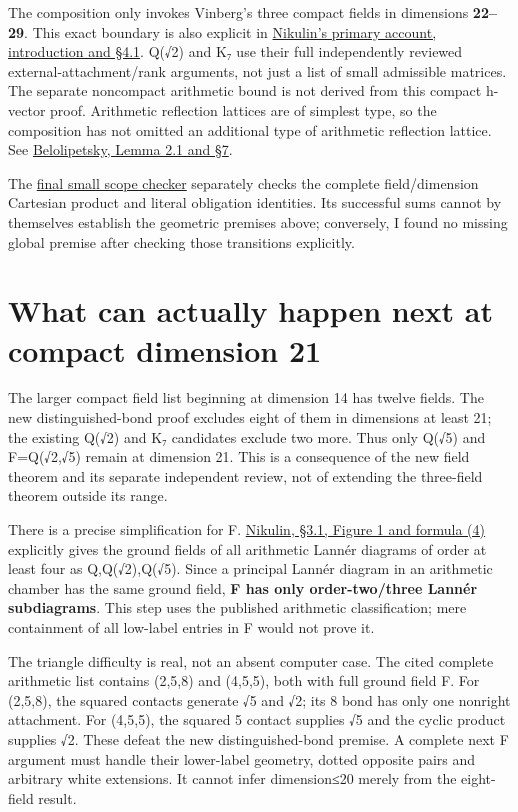 \documentclass[
  10pt,
]{report}
\begin{document}
The composition only invokes Vinberg's three compact fields in
dimensions \textbf{22--29}. This exact boundary is also explicit in
\href{https://arxiv.org/pdf/0708.3991}{Nikulin's primary account,
introduction and §4.1}. Q(√2) and K₇ use their full independently
reviewed external-attachment/rank arguments, not just a list of small
admissible matrices. The separate noncompact arithmetic bound is not
derived from this compact h-vector proof. Arithmetic reflection lattices
are of simplest type, so the composition has not omitted an additional
type of arithmetic reflection lattice. See
\href{https://arxiv.org/pdf/1506.03111}{Belolipetsky, Lemma 2.1 and §7}.

The \href{fresh_arithmetic_dimension21_scope_check_20261016.md}{final
small scope checker} separately checks the complete field/dimension
Cartesian product and literal obligation identities. Its successful sums
cannot by themselves establish the geometric premises above; conversely,
I found no missing global premise after checking those transitions
explicitly.

\section{What can actually happen next at compact dimension
21}\label{what-can-actually-happen-next-at-compact-dimension-21}

The larger compact field list beginning at dimension 14 has twelve
fields. The new distinguished-bond proof excludes eight of them in
dimensions at least 21; the existing Q(√2) and K₇ candidates exclude two
more. Thus only Q(√5) and F=Q(√2,√5) remain at dimension 21. This is a
consequence of the new field theorem and its separate independent
review, not of extending the three-field theorem outside its range.

There is a precise simplification for F.
\href{https://arxiv.org/pdf/0708.3991}{Nikulin, §3.1, Figure 1 and
formula (4)} explicitly gives the ground fields of all arithmetic Lannér
diagrams of order at least four as Q,Q(√2),Q(√5). Since a principal
Lannér diagram in an arithmetic chamber has the same ground field,
\textbf{F has only order-two/three Lannér subdiagrams}. This step uses
the published arithmetic classification; mere containment of all
low-label entries in F would not prove it.

The triangle difficulty is real, not an absent computer case. The cited
complete arithmetic list contains (2,5,8) and (4,5,5), both with full
ground field F. For (2,5,8), the squared contacts generate √5 and √2;
its 8 bond has only one nonright attachment. For (4,5,5), the squared 5
contact supplies √5 and the cyclic product supplies √2. These defeat the
new distinguished-bond premise. A complete next F argument must handle
their lower-label geometry, dotted opposite pairs and arbitrary white
extensions. It cannot infer dimension≤20 merely from the eight-field
result.
\end{document}
